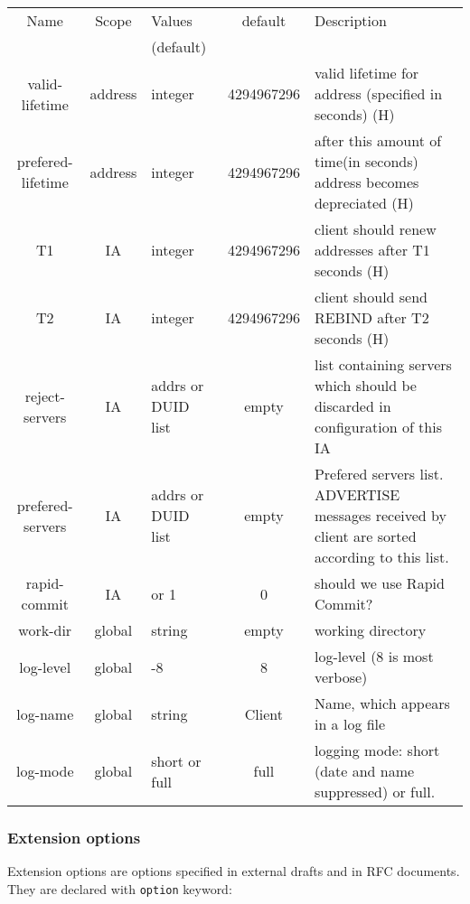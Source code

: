 \begin{center}
\begin{tabular}{|c|c|>{\centering}p{1.7cm}<{}|c|p{6cm}|}
\hline
Name              & Scope  & Values     & default    & Description \\
                  &        & (default)  &            & \\
\hline
valid-lifetime    & address& integer    & 4294967296 & valid lifetime for address (specified in seconds) (H)\\
prefered-lifetime & address& integer    & 4294967296 & after this amount of time(in seconds) address becomes depreciated (H)\\
T1                & IA     & integer    & 4294967296 & client should renew addresses after T1 seconds (H)\\
T2                & IA     & integer    & 4294967296 & client should send REBIND after T2 seconds (H)\\
reject-servers    & IA     & addrs or
                             DUID list  & empty      & list containing servers which should be discarded in configuration of this IA \\
prefered-servers  & IA     & addrs or 
                             DUID list  & empty      & Prefered servers list. ADVERTISE messages received by client are sorted according to this list. \\
rapid-commit      & IA     & 0 or 1     & 0          & should we use Rapid Commit? \\
work-dir          & global & string     & empty      & working directory \\
log-level         & global & 1-8        & 8          & log-level (8 is most verbose) \\
log-name          & global & string     & Client     & Name, which appears in a log file\\
log-mode          & global &short or full& full      & logging mode: short (date and name suppressed) or full. \\
\hline
\end{tabular}
\end{center}

\subsubsection{Extension options}
Extension options are options specified in external drafts and in RFC
documents. They are declared with \verb+option+ keyword:

